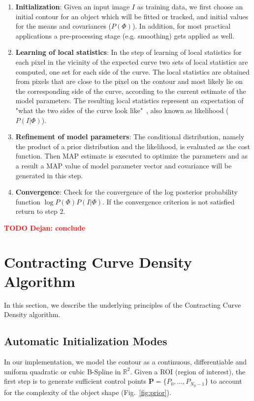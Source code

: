 \documentclass[conference]{IEEEtran}
\newcommand{\todod}[1]{\textbf{\textcolor{red}{TODO Dejan: #1}}}
\begin{document}
\begin{enumerate}
\item \textbf{Initialization}: Given an input image $I$ as training data, we first choose an initial
  contour for an object which will be fitted or tracked, and
  initial values for the means and covariances ($P(\Phi)$). In addition, for most practical
  applications a pre-processing stage (e.g. smoothing) gets applied as well.
\item \textbf{Learning of local statistics}: 
  In the step of learning of local statistics for each pixel in the
  vicinity of the expected curve two sets of local statistics
  are computed, one set for each side of the curve. The local statistics are obtained from
  pixels that are close to the pixel on the contour and most likely lie
  on the corresponding side of the curve, according to the current
  estimate of the model parameters. The resulting local statistics
  represent an expectation of "what the two sides of the curve look
  like"~\cite{hanek2004contracting}, also known as likelihood ($P(I|\Phi)$).
\item \textbf{Refinement of model parameters}: The conditional distribution, namely
  the product of a prior distribution and the likelihood, is evaluated
  as the cost function. Then MAP estimate is executed to optimize the
  parameters and as a result a MAP value of model parameter vector and
  covariance will be generated in this step.
\item \textbf{Convergence}: Check for the convergence of the 
  log posterior probability function $\log{P(\Phi) P(I|\Phi)}$. 
  If the convergence criterion is not satisfied return to step 2.
\end{enumerate}
\todod{conclude}

\section{Contracting Curve Density Algorithm}
\label{sec:ccd_novelties}
In this section, we describe the underlying principles of the Contracting Curve Density
algorithm.

\subsection{Automatic Initialization Modes}
In our implementation, we model the
contour as a continuous, differentiable and uniform quadratic or cubic
B-Spline in $\mathbb{R}^2$.
Given a ROI (region of interest), the first step is to generate
sufficient control points $\mathbf{P} = \{P_0, \ldots, P_{N_p-1}\}$ to
account for the complexity of the object shape (Fig.~\ref{fig:prior}).
\end{document}
